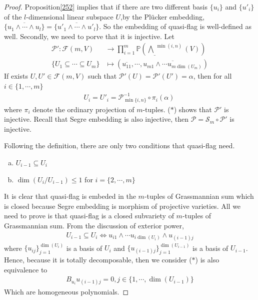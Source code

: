 \documentclass[10pt,UTF8]{article}
\theoremstyle{definition}
\newtheorem*{proof}{Proof}
\begin{document}
\begin{proof}
  Proposition\ref{252} implies that if there are two different basis $\{u_i\}$ and $\{{u}'_i\}$ of the $l$-dimensional linear subspace $U$,by the Plücker embedding, $\overline{\{u_1\wedge\cdots\wedge u_l\}} = \overline{\{u'_1\wedge\cdots\wedge u'_l\}}$.
  So the embedding of quasi-flag is well-defined as well.
  Secondly, we need to porve that it is injective. Let 
  \begin{align*}
    \mathscr{P}':\mathcal{F}(m,V)&\to  \prod_{i=1}^{m} \mathbb{P}(\underline{\bigwedge}^{\min(i,n)}(V)) \\
    \{U_1\subseteq \cdots \subseteq U_m\}  &\mapsto (\overline{u_{11}},\cdots,\overline{u_{m1}\wedge \cdots u_{m\dim(U_m)}} )
  \end{align*}
  If exists $U,U'\in \mathcal{F}(m,V)$ such that $\mathscr{P}'(U)=\mathscr{P}'(U')=\alpha$, then for all $i\in \{1,\cdots,m\}$ 
  \begin{align*}
    U_i=U'_i = \mathcal{P}_{\min\{i,n\}}^{-1}\circ \pi_{i} (\alpha) \ \tag{$*$}
  \end{align*}
  where $\pi_i$ denote the ordinary projection of $m$-tuples. ($*$) shows that $\mathscr{P}'$ is injective.
  Recall that Segre embedding is also injective, then $\mathscr{P} = \mathscr{S}_m\circ \mathscr{P}'$ is injective.

 

  Following the definition, there are only two conditions that quasi-flag need.
  \begin{enumerate}[a)]
    \item $U_{i-1}\subseteq U_{i}$
    \item $\dim(U_i/U_{i-1}) \le 1$ for $i=\{2,\cdots,m\}$
  \end{enumerate}
  It is clear that quasi-flag is embeded in the $m$-tuples of Grassmannian sum which is closed because Segre embedding is morphism of projective varieties. 
  All we need to prove is that quasi-flag is a closed subvariety of $m$-tuples of Grassmannian sum.
  From the discussion of exterior power, 
  \begin{align*}
    U_{i-1}\subseteq U_{i}\Leftrightarrow u_{i1}\wedge\cdots u_{i\dim(U_i)}\wedge u_{(i-1)j} \tag{$*$}
  \end{align*} 
  where $\{u_{ij}\}_{j=1}^{\dim(U_i)}$ is a basis of $U_i$ and $\{u_{(i-1)j}\}_{j=1}^{\dim(U_{i-1})}$ is a basis of $U_{i-1}$. 
  Hence, because it is totally decomposable, then we consider ($*$) is also equivalence to 
  \begin{align*}
    B_{u_i} u_{(i-1)j}=0 ,j\in\{1,\cdots,\dim(U_{i-1})\}
  \end{align*}
  Which are homogeneous polynomials.


\end{proof}
\end{document}
